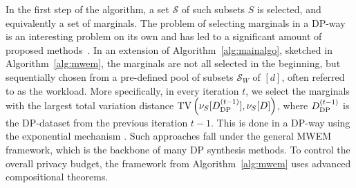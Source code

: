In the first step of the algorithm, a set $\mathcal{S}$ of such subsets $S$ is selected, and equivalently a set of marginals. 
The problem of selecting marginals in a DP-way is an interesting problem on its own and has led to a significant amount of proposed methods~\citep{cai2021data, mst, aim, zhang2021privsyn}. 
In an
extension of Algorithm~\ref{alg:mainalgo}, sketched in Algorithm~\ref{alg:mwem}, the marginals are not all selected in the beginning, but sequentially chosen from 
a pre-defined pool of subsets $\mathcal S_W$ of $[d]$, often referred to as the workload.
More specifically, in every iteration $t$, we select the marginals with the largest total variation distance $\text{TV}\left( \nu_{S}[D_{\text{DP}}^{(t-1)}], \nu_{S}[D]\right) $, where $D_{\text{DP}}^{(t-1)}$ is the DP-dataset from the previous iteration $t-1$. This is done
in a DP-way using the exponential mechanism \cite{mcsherry2007mechanism}. Such approaches fall under the general MWEM~\citep{mwem,liu2021iterative} framework, which is the backbone of many DP synthesis methods. To control the overall privacy budget, the framework from Algorithm~\ref{alg:mwem} uses advanced compositional theorems. 


